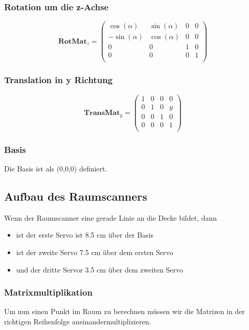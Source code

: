 \documentclass[a4paper,11pt,DIV11]{scrartcl}
\begin{document}
\subsubsection*{Rotation um die z-Achse}
\begin{equation}
\bm{RotMat}_{z} = 
\begin{pmatrix}
 \cos(\alpha) & \sin(\alpha) & 0 & 0 \\
-\sin(\alpha) & \cos(\alpha) & 0 & 0 \\
0 & 0 & 1 & 0 \\
0 & 0 & 0 & 1 \\
\end{pmatrix}
\end{equation}

\subsubsection*{Translation in y Richtung}
\begin{equation}
\bm{TransMat}_{y} = 
\begin{pmatrix}
1 & 0 & 0 & 0 \\
0 & 1 & 0 & y \\
0 & 0 & 1 & 0 \\
0 & 0 & 0 & 1 \\
\end{pmatrix}
\end{equation}

\subsubsection*{Basis}
Die Basis ist als (0,0,0) definiert.

\subsection{Aufbau des Raumscanners}
Wenn der Raumscanner eine gerade Linie an die Decke bildet, dann
\begin{itemize}
\item ist der erste Servo ist 8.5 cm über der Basis
\item ist der zweite Servo 7.5 cm über dem ersten Servo
\item und der dritte Servor 3.5 cm über dem zweiten Servo
\end{itemize}

\subsubsection*{Matrixmultiplikation}
Um nun einen Punkt im Raum zu berechnen müssen wir die Matrizen in der richtigen Reihenfolge aneinandermultiplizieren.
\end{document}
